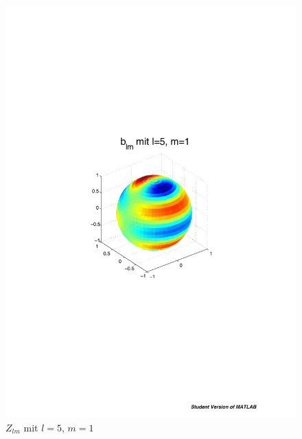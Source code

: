 \begin{refsection}
\begin{figure}
\begin{minipage}[hbt]{0.4\textwidth}
\includegraphics[width=1\textwidth]{kugel/ylm/b_5_1.pdf}
\caption{$Z_{lm}$ mit $l=5$, $m=1$}
\label{skript:zlm l=5 m=1}
\end{minipage}
\begin{minipage}[hbt]{0.4\textwidth}
\centering

\end{minipage}
\end{figure}
\end{refsection}
